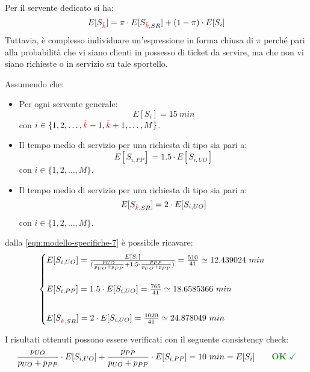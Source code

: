 Per il servente dedicato si ha:
\begin{equation}
E[S_{\color{red}\hat{k}}] = \pi \cdot E[S_{{\color{red}\hat{k}}, SR}] + (1-\pi) \cdot E[S_i]
\end{equation}
Tuttavia, è complesso individuare un'espressione in forma chiusa di $\pi$ perché pari alla probabilità che vi siano clienti in possesso di ticket \sr{} da servire, ma che non vi siano richieste \uo{} o \pp{} in servizio su tale sportello.

\newpage

Assumendo che:
\begin{itemize}
\item Per ogni servente generale:
\begin{equation}
E[S_i] = 15\ min
\end{equation}
con $i \in \lbrace 1, 2, \dots, {\color{red}\hat{k}}-1, {\color{red}\hat{k}}+1, \dots, M\rbrace$.
\item Il tempo medio di servizio per una richiesta di tipo \pp{} sia pari a:
\begin{equation}
E[S_{i, PP}] = 1.5 \cdot E[S_{i, UO}]
\end{equation}
con $i \in \lbrace 1, 2, \dots, M\rbrace$.
\item Il tempo medio di servizio per una richiesta di tipo \sr{} sia pari a:
\begin{equation}
E[S_{{\color{red}\hat{k}}, SR}] = 2 \cdot E[S_{i, UO}]
\end{equation}
con $i \in \lbrace 1, 2, \dots, M\rbrace$.
\end{itemize}
dalla \ref{eqn:modello-specifiche-7} è possibile ricavare:
\begin{equation}
\begin{cases}
E[S_{i,UO}] = \frac{E[S_i]}{(\frac{p_{UO}}{p_{UO} + p_{PP}} + 1.5\cdot \frac{p_{PP}}{p_{UO} + p_{PP}})} = \frac{510}{41} \simeq 12.439024\ min \\[2em]
E[S_{i,PP}] = 1.5\cdot E[S_{i,UO}] = \frac{765}{41} \simeq 18.6585366\ min \\[2em]
E[S_{\ded,SR}] = 2 \cdot E[S_{i,UO}] = \frac{1020}{41} \simeq 24.878049\ min
\end{cases}
\end{equation}

I risultati ottenuti possono essere verificati con il seguente consistency check:
\begin{equation}
\frac{p_{UO}}{p_{UO} + p_{PP}} \cdot E[S_{i, UO}] +  \frac{p_{PP}}{p_{UO} + p_{PP}} \cdot E[S_{i, PP}] = 10\ min = E[S_i]\qquad \text{\color{forestgreen}\textbf{OK} \checkmark}
\end{equation}

